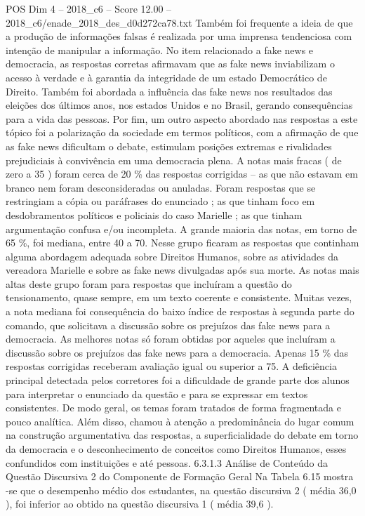 \begin{textsample}{POS Dim 4 – 2018\_c6 – Score 12.00 – 2018\_c6/enade\_2018\_des\_d0d272ca78.txt}
Também foi frequente a ideia de que a produção de informações falsas é realizada por uma imprensa tendenciosa com intenção de manipular a informação.
No item relacionado a fake news e democracia, as respostas corretas afirmavam que as fake news inviabilizam o acesso à verdade e à garantia da integridade de um estado Democrático de Direito.
Também foi abordada a influência das fake news nos resultados das eleições dos últimos anos, nos estados Unidos e no Brasil, gerando consequências para a vida das pessoas.
Por fim, um outro aspecto abordado nas respostas a este tópico foi a polarização da sociedade em termos políticos, com a afirmação de que as fake news dificultam o debate, estimulam posições extremas e rivalidades prejudiciais à convivência em uma democracia plena.
A notas mais fracas ( de zero a 35 ) foram cerca de 20 \% das respostas corrigidas – as que não estavam em branco nem foram desconsideradas ou anuladas.
Foram respostas que se restringiam a cópia ou paráfrases do enunciado ; as que tinham foco em desdobramentos políticos e policiais do caso Marielle ; as que tinham argumentação confusa e/ou incompleta.
A grande maioria das notas, em torno de 65 \%, foi mediana, entre 40 a 70.
Nesse grupo ficaram as respostas que continham alguma abordagem adequada sobre Direitos Humanos, sobre as atividades da vereadora Marielle e sobre as fake news divulgadas após sua morte.
As notas mais altas deste grupo foram para respostas que incluíram a questão do tensionamento, quase sempre, em um texto coerente e consistente.
Muitas vezes, a nota mediana foi consequência do baixo índice de respostas à segunda parte do comando, que solicitava a discussão sobre os prejuízos das fake news para a democracia.
As melhores notas só foram obtidas por aqueles que incluíram a discussão sobre os prejuízos das fake news para a democracia.
Apenas 15 \% das respostas corrigidas receberam avaliação igual ou superior a 75.
A deficiência principal detectada pelos corretores foi a dificuldade de grande parte dos alunos para interpretar o enunciado da questão e para se expressar em textos consistentes.
De modo geral, os temas foram tratados de forma fragmentada e pouco analítica.
Além disso, chamou à atenção a predominância do lugar comum na construção argumentativa das respostas, a superficialidade do debate em torno da democracia e o desconhecimento de conceitos como Direitos Humanos, esses confundidos com instituições e até pessoas. 6.3.1.3 Análise de Conteúdo da Questão Discursiva 2 do Componente de Formação Geral Na Tabela 6.15 mostra -se que o desempenho médio dos estudantes, na questão discursiva 2 ( média 36,0 ), foi inferior ao obtido na questão discursiva 1 ( média 39,6 ).

\end{textsample}
